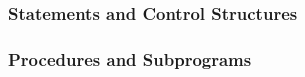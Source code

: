\documentclass[12pt]{article}
\begin{document}
\subsubsection{Statements and Control Structures}

\subsubsection{Procedures and Subprograms}


\iffalse



%
%
%

\fi
\end{document}
